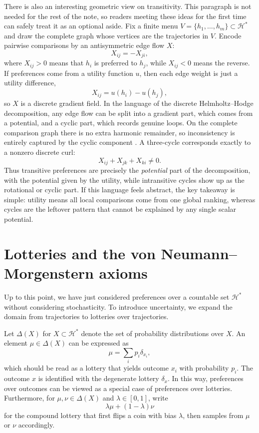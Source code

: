 \documentclass[11pt]{article}
\newcommand{\Hcal}{\mathcal{H}}
\newcommand{\Lot}{\Delta}
\begin{document}
There is also an interesting geometric view on transitivity. This paragraph is
not needed for the rest of the note, so readers meeting these ideas for the
first time can safely treat it as an optional aside. Fix a finite menu
$V=\{h_1,\dots,h_m\}\subset \Hcal^*$ and draw the complete graph whose vertices
are the trajectories in $V$. Encode pairwise comparisons by an antisymmetric
edge flow $X$:
\[
X_{ij} = -X_{ji},
\]
where $X_{ij}>0$ means that $h_i$ is preferred to $h_j$, while $X_{ij}<0$ means
the reverse. If preferences come from a utility function $u$, then each edge
weight is just a utility difference,
\[
X_{ij}=u(h_i)-u(h_j),
\]
so $X$ is a discrete gradient field. In the language of the discrete
Helmholtz--Hodge decomposition, any edge flow can be split into a gradient part,
which comes from a potential, and a cyclic part, which records genuine loops.
On the complete comparison graph there is no extra harmonic remainder, so
inconsistency is entirely captured by the cyclic component
\citep{jiang2011statistical}. A three-cycle corresponds exactly to a nonzero
discrete curl:
\[
X_{ij}+X_{jk}+X_{ki}\neq 0.
\]
Thus transitive preferences are precisely the \emph{potential} part of the
decomposition, with the potential given by the utility, while intransitive
cycles show up as the rotational or cyclic part. If this language feels
abstract, the key takeaway is simple: utility means all local comparisons come
from one global ranking, whereas cycles are the leftover pattern that cannot be
explained by any single scalar potential.

\section{Lotteries and the von Neumann--Morgenstern axioms}
\label{sec:lotteries-vnm}

Up to this point, we have just considered preferences over a countable set
$\Hcal^*$ without considering stochasticity.
To introduce uncertainty, we expand the domain from trajectories to lotteries
over trajectories.

Let $\Lot(X)$ for $X\subset\Hcal^*$ denote the set of probability
distributions over $X$. An element $\mu\in\Lot(X)$ can be expressed
as
\[
\mu = \sum_{i} p_i \delta_{x_i},
\]
which should be read as a lottery that yields outcome $x_i$ with probability $p_i$.
The outcome $x$ is identified with the degenerate lottery $\delta_x$.
In this way, preferences over outcomes can be viewed as a special case of
preferences over lotteries.
Furthermore, for $\mu,\nu \in \Lot(X)$ and $\lambda \in [0,1]$, write
\[
\lambda \mu + (1-\lambda)\nu
\]
for the compound lottery that first flips a coin with bias $\lambda$, then samples from $\mu$ or $\nu$ accordingly.
\end{document}
